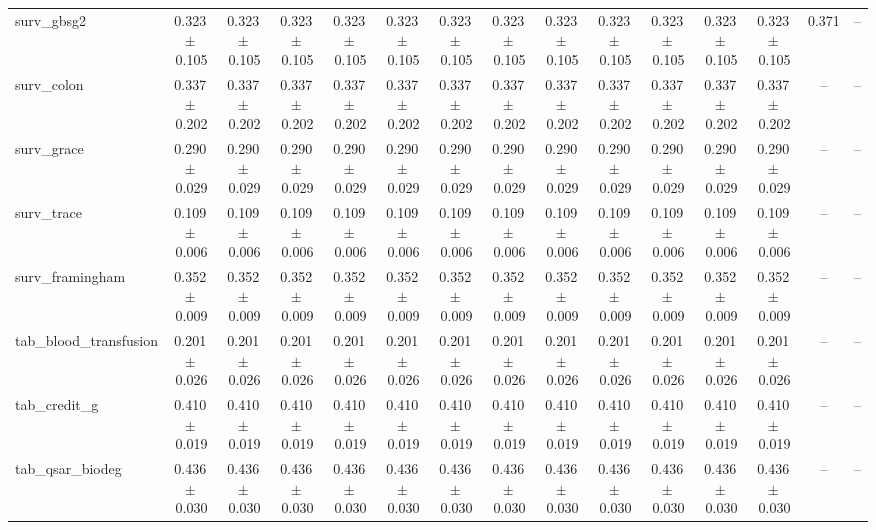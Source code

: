 \documentclass[8pt]{extarticle}
\begin{document}
\begin{longtable}{l*{14}{c}}
surv\_gbsg2 & 0.323\,$\pm$\,0.105 & 0.323\,$\pm$\,0.105 & 0.323\,$\pm$\,0.105 & 0.323\,$\pm$\,0.105 & 0.323\,$\pm$\,0.105 & 0.323\,$\pm$\,0.105 & 0.323\,$\pm$\,0.105 & 0.323\,$\pm$\,0.105 & 0.323\,$\pm$\,0.105 & 0.323\,$\pm$\,0.105 & 0.323\,$\pm$\,0.105 & 0.323\,$\pm$\,0.105 & 0.371 & -- \\
surv\_colon & 0.337\,$\pm$\,0.202 & 0.337\,$\pm$\,0.202 & 0.337\,$\pm$\,0.202 & 0.337\,$\pm$\,0.202 & 0.337\,$\pm$\,0.202 & 0.337\,$\pm$\,0.202 & 0.337\,$\pm$\,0.202 & 0.337\,$\pm$\,0.202 & 0.337\,$\pm$\,0.202 & 0.337\,$\pm$\,0.202 & 0.337\,$\pm$\,0.202 & 0.337\,$\pm$\,0.202 & -- & -- \\
surv\_grace & 0.290\,$\pm$\,0.029 & 0.290\,$\pm$\,0.029 & 0.290\,$\pm$\,0.029 & 0.290\,$\pm$\,0.029 & 0.290\,$\pm$\,0.029 & 0.290\,$\pm$\,0.029 & 0.290\,$\pm$\,0.029 & 0.290\,$\pm$\,0.029 & 0.290\,$\pm$\,0.029 & 0.290\,$\pm$\,0.029 & 0.290\,$\pm$\,0.029 & 0.290\,$\pm$\,0.029 & -- & -- \\
surv\_trace & 0.109\,$\pm$\,0.006 & 0.109\,$\pm$\,0.006 & 0.109\,$\pm$\,0.006 & 0.109\,$\pm$\,0.006 & 0.109\,$\pm$\,0.006 & 0.109\,$\pm$\,0.006 & 0.109\,$\pm$\,0.006 & 0.109\,$\pm$\,0.006 & 0.109\,$\pm$\,0.006 & 0.109\,$\pm$\,0.006 & 0.109\,$\pm$\,0.006 & 0.109\,$\pm$\,0.006 & -- & -- \\
surv\_framingham & 0.352\,$\pm$\,0.009 & 0.352\,$\pm$\,0.009 & 0.352\,$\pm$\,0.009 & 0.352\,$\pm$\,0.009 & 0.352\,$\pm$\,0.009 & 0.352\,$\pm$\,0.009 & 0.352\,$\pm$\,0.009 & 0.352\,$\pm$\,0.009 & 0.352\,$\pm$\,0.009 & 0.352\,$\pm$\,0.009 & 0.352\,$\pm$\,0.009 & 0.352\,$\pm$\,0.009 & -- & -- \\
tab\_blood\_transfusion & 0.201\,$\pm$\,0.026 & 0.201\,$\pm$\,0.026 & 0.201\,$\pm$\,0.026 & 0.201\,$\pm$\,0.026 & 0.201\,$\pm$\,0.026 & 0.201\,$\pm$\,0.026 & 0.201\,$\pm$\,0.026 & 0.201\,$\pm$\,0.026 & 0.201\,$\pm$\,0.026 & 0.201\,$\pm$\,0.026 & 0.201\,$\pm$\,0.026 & 0.201\,$\pm$\,0.026 & -- & -- \\
tab\_credit\_g & 0.410\,$\pm$\,0.019 & 0.410\,$\pm$\,0.019 & 0.410\,$\pm$\,0.019 & 0.410\,$\pm$\,0.019 & 0.410\,$\pm$\,0.019 & 0.410\,$\pm$\,0.019 & 0.410\,$\pm$\,0.019 & 0.410\,$\pm$\,0.019 & 0.410\,$\pm$\,0.019 & 0.410\,$\pm$\,0.019 & 0.410\,$\pm$\,0.019 & 0.410\,$\pm$\,0.019 & -- & -- \\
tab\_qsar\_biodeg & 0.436\,$\pm$\,0.030 & 0.436\,$\pm$\,0.030 & 0.436\,$\pm$\,0.030 & 0.436\,$\pm$\,0.030 & 0.436\,$\pm$\,0.030 & 0.436\,$\pm$\,0.030 & 0.436\,$\pm$\,0.030 & 0.436\,$\pm$\,0.030 & 0.436\,$\pm$\,0.030 & 0.436\,$\pm$\,0.030 & 0.436\,$\pm$\,0.030 & 0.436\,$\pm$\,0.030 & -- & -- \\

\end{longtable}
\end{document}
